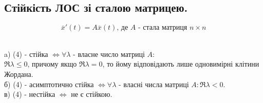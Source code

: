 \subsection{Стійкість ЛОС зі сталою матрицею.}

\begin{equation}
\overline{x} ' (t) = A \overline{x} (t) \text{, де $A$ - стала матриця $n \times n$}
\end{equation}
\begin{boxteo} \quad \\
a) (4) - стійка $ \Longleftrightarrow  \forall \lambda $ - власне число матриці $A$: \\
$\Re \lambda \leq 0$, причому якщо $ \Re \lambda = 0$, то йому відповідають лише одновимірні клітини Жордана. \\
б) (4) - асимптотично стійка $ \Longleftrightarrow \forall \lambda $ - власні числа матриці $A: \Re \lambda < 0 $.\\
в) (4) - нестійка $ \Longleftrightarrow $ не є стійкою.
\end{boxteo}


